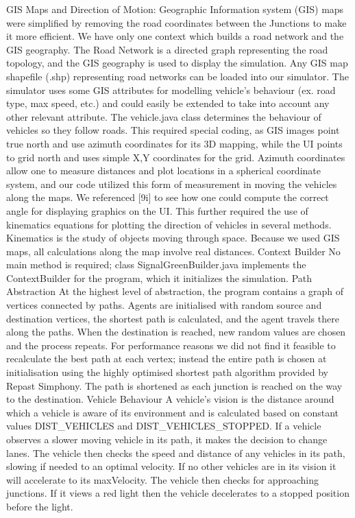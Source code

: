 \documentclass[11pt]{article}
\begin{document}
GIS Maps and Direction of Motion:
Geographic Information system (GIS) maps were simplified by removing the road coordinates between the Junctions to make it more efficient. We have only one context which builds a road network and the GIS geography. The Road Network is a directed graph representing the road topology, and the GIS geography is used to display the simulation.
Any GIS map shapefile (.shp) representing road networks can be loaded into our simulator. The simulator uses some GIS attributes for modelling vehicle’s behaviour (ex. road type, max speed, etc.) and could easily be extended to take into account any other relevant attribute.
The vehicle.java class determines the behaviour of vehicles so they follow roads. This required special coding, as GIS images point true north and use azimuth coordinates for its 3D mapping, while the UI points to grid north and uses simple X,Y coordinates for the grid. Azimuth coordinates allow one to measure distances and plot locations in a spherical coordinate system, and our code utilized this form of measurement in moving the vehicles along the maps. We referenced [9i] to see how one could compute the correct angle for displaying graphics on the UI. This further required the use of kinematics equations for plotting the direction of vehicles in several methods. Kinematics is the study of objects moving through space. Because we used GIS maps, all calculations along the map involve real distances.
Context Builder
No main method is required; class SignalGreenBuilder.java implements the ContextBuilder for the program, which it initializes the simulation.
Path Abstraction
At the highest level of abstraction, the program contains a graph of vertices connected by paths. Agents are initialised with random source and destination vertices, the shortest path is calculated, and the agent travels there along the paths. When the destination is reached, new random values are chosen and the process repeats. 
For performance reasons we did not find it feasible to recalculate the best path at each vertex; instead the entire path is chosen at initialisation using the highly optimised shortest path algorithm provided by Repast Simphony. The path is shortened as each junction is reached on the way to the destination. 
Vehicle Behaviour
A vehicle’s vision is the distance around which a vehicle is aware of its environment and is calculated based on constant values DIST_VEHICLES and DIST_VEHICLES_STOPPED.
If a vehicle observes a slower moving vehicle in its path, it makes the decision to change lanes. The vehicle then checks the speed and distance of any vehicles in its path, slowing if needed to an optimal velocity. If no other vehicles are in its vision it will accelerate to its maxVelocity. The vehicle then checks for approaching junctions. If it views a red light then the vehicle decelerates to a stopped position before the light. 
\end{document}
